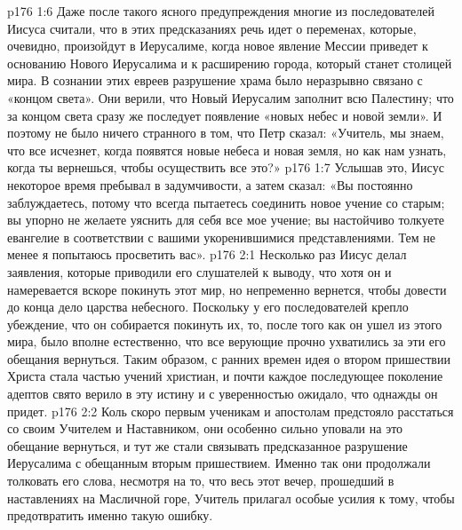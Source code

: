 \vs p176 1:6 Даже после такого ясного предупреждения многие из последователей Иисуса считали, что в этих предсказаниях речь идет о переменах, которые, очевидно, произойдут в Иерусалиме, когда новое явление Мессии приведет к основанию Нового Иерусалима и к расширению города, который станет столицей мира. В сознании этих евреев разрушение храма было неразрывно связано с «концом света». Они верили, что Новый Иерусалим заполнит всю Палестину; что за концом света сразу же последует появление «новых небес и новой земли». И поэтому не было ничего странного в том, что Петр сказал: «Учитель, мы знаем, что все исчезнет, когда появятся новые небеса и новая земля, но как нам узнать, когда ты вернешься, чтобы осуществить все это?»
\vs p176 1:7 Услышав это, Иисус некоторое время пребывал в задумчивости, а затем сказал: «Вы постоянно заблуждаетесь, потому что всегда пытаетесь соединить новое учение со старым; вы упорно не желаете уяснить для себя все мое учение; вы настойчиво толкуете евангелие в соответствии с вашими укоренившимися представлениями. Тем не менее я попытаюсь просветить вас».
\vs p176 2:1 Несколько раз Иисус делал заявления, которые приводили его слушателей к выводу, что хотя он и намеревается вскоре покинуть этот мир, но непременно вернется, чтобы довести до конца дело царства небесного. Поскольку у его последователей крепло убеждение, что он собирается покинуть их, то, после того как он ушел из этого мира, было вполне естественно, что все верующие прочно ухватились за эти его обещания вернуться. Таким образом, с ранних времен идея о втором пришествии Христа стала частью учений христиан, и почти каждое последующее поколение адептов свято верило в эту истину и с уверенностью ожидало, что однажды он придет.
\vs p176 2:2 Коль скоро первым ученикам и апостолам предстояло расстаться со своим Учителем и Наставником, они особенно сильно уповали на это обещание вернуться, и тут же стали связывать предсказанное разрушение Иерусалима с обещанным вторым пришествием. Именно так они продолжали толковать его слова, несмотря на то, что весь этот вечер, прошедший в наставлениях на Масличной горе, Учитель прилагал особые усилия к тому, чтобы предотвратить именно такую ошибку.
